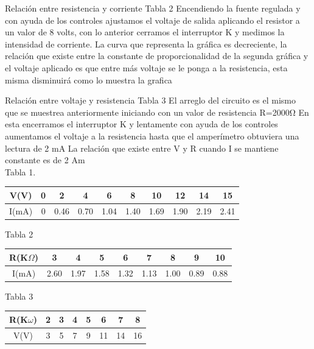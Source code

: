 \documentclass[10pt]{article}
\begin{document}
\begin{multicols}{2}
Relación entre resistencia y corriente 
Tabla 2 
Encendiendo la fuente regulada y con ayuda de los controles ajustamos el voltaje de salida aplicando el resistor a un valor de 8 volts, con lo anterior cerramos el interruptor K y medimos la intensidad de corriente. 
La curva que representa la gráfica es decreciente, la relación que existe entre la constante de proporcionalidad de la segunda gráfica y el voltaje aplicado es que entre más voltaje se le ponga a la resistencia, esta misma disminuirá como lo muestra la grafica 

Relación entre voltaje y resistencia 
Tabla 3 
El arreglo del circuito es el mismo que se muestrea anteriormente iniciando con un valor de resistencia R=2000Ω
En esta encerramos el interruptor K y lentamente con ayuda de los controles aumentamos el voltaje a la resistencia hasta que el amperímetro obtuviera una lectura de 2 mA
La relación que existe entre V y R cuando I se mantiene constante es de 2 Am\\
Tabla 1.
\begin{center}
	\begin{adjustbox}{width=245pt}
		\begin{tabular}{|c|c|c|c|c|c|c|c|c|c|}
			\hline
			V(V) & 0 & 2 & 4 & 6 & 8 & 10 & 12 & 14 & 15 \\
			\hline
			I(mA) & 0 & 0.46 & 0.70 & 1.04 & 1.40 & 1.69 & 1.90 & 2.19 & 2.41 \\
			\hline
			
		\end{tabular}
	\end{adjustbox}
\end{center} 
Tabla 2
\begin{center}
	\begin{adjustbox}{width=245pt}
		\begin{tabular}{|c|c|c|c|c|c|c|c|c|}
			\hline
			R(K$\varOmega$) & 3 & 4 & 5 & 6 & 7 & 8 & 9 & 10  \\
			\hline
			I(mA) & 2.60 & 1.97 & 1.58 & 1.32 & 1.13 & 1.00 & 0.89 & 0.88 \\
			\hline
			
		\end{tabular}
	\end{adjustbox}
\end{center}
Tabla 3
\begin{center}
	\begin{adjustbox}{width=245pt}
		\begin{tabular}{|c|c|c|c|c|c|c|c|}
			\hline
			R(K$\omega$) & 2 & 3 & 4 & 5 & 6 & 7 & 8   \\
			\hline
			V(V) & 3 & 5 & 7 & 9 & 11 & 14 & 16 \\
			\hline
			

\end{tabular}
\end{adjustbox}
\end{center}
\end{multicols}
\end{document}
